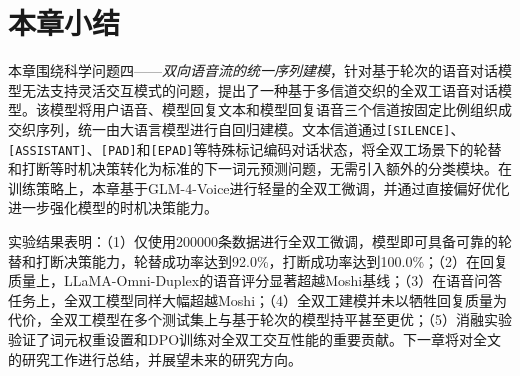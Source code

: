 \section{本章小结}

本章围绕科学问题四——\textit{双向语音流的统一序列建模}，针对基于轮次的语音对话模型无法支持灵活交互模式的问题，提出了一种基于多信道交织的全双工语音对话模型。该模型将用户语音、模型回复文本和模型回复语音三个信道按固定比例组织成交织序列，统一由大语言模型进行自回归建模。文本信道通过\texttt{[SILENCE]}、\texttt{[ASSISTANT]}、\texttt{[PAD]}和\texttt{[EPAD]}等特殊标记编码对话状态，将全双工场景下的轮替和打断等时机决策转化为标准的下一词元预测问题，无需引入额外的分类模块。在训练策略上，本章基于GLM-4-Voice进行轻量的全双工微调，并通过直接偏好优化进一步强化模型的时机决策能力。

实验结果表明：（1）仅使用200000条数据进行全双工微调，模型即可具备可靠的轮替和打断决策能力，轮替成功率达到92.0\%，打断成功率达到100.0\%；（2）在回复质量上，LLaMA-Omni-Duplex的语音评分显著超越Moshi基线；（3）在语音问答任务上，全双工模型同样大幅超越Moshi；（4）全双工建模并未以牺牲回复质量为代价，全双工模型在多个测试集上与基于轮次的模型持平甚至更优；（5）消融实验验证了词元权重设置和DPO训练对全双工交互性能的重要贡献。下一章将对全文的研究工作进行总结，并展望未来的研究方向。

